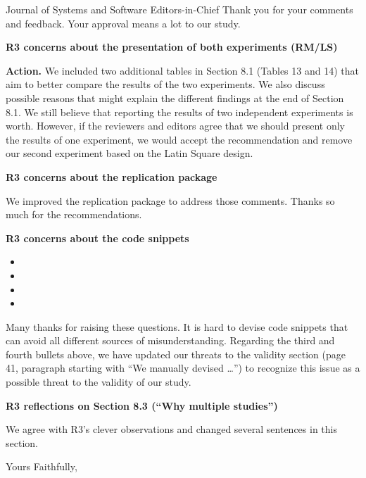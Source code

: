 \documentclass{letter}
\begin{document}
\begin{letter}{Journal of Systems and Software Editors-in-Chief}
Thank you for your comments and feedback. Your approval means a lot to our study.

{\bf R3 concerns about the presentation of both experiments (RM/LS)}

{\bf Action.} We included two additional tables in Section 8.1 (Tables 13 and 14) that
aim to better compare the results of the two experiments. We also
discuss possible reasons that might explain the different findings at the end of Section 8.1.
We still believe that reporting the results of two independent experiments is worth. However,
if the reviewers and editors agree that we should present only the results of one
experiment, we would accept the recommendation and remove our second experiment
based on the Latin Square design. 

{\bf R3 concerns about the replication package}

We improved the replication package to address those comments. Thanks so much for the
recommendations.

{\bf R3 concerns about the code snippets}


\begin{itemize}
 \item {}
 \item {}
 \item {}
\item  {}
\end{itemize}

Many thanks for raising these questions. It is hard to devise code snippets that can avoid
all different sources of misunderstanding. Regarding the third and fourth bullets above,
we have updated our threats to the validity section (page 41, paragraph starting with ``We manually devised \ldots'')
to recognize this issue as a possible threat to the validity of our study. 

{\bf R3 reflections on Section 8.3 (``Why multiple studies'')}

We agree with R3's clever observations and changed several sentences in this section. 

\closing{Yours Faithfully,}


\end{letter}
\end{document}
